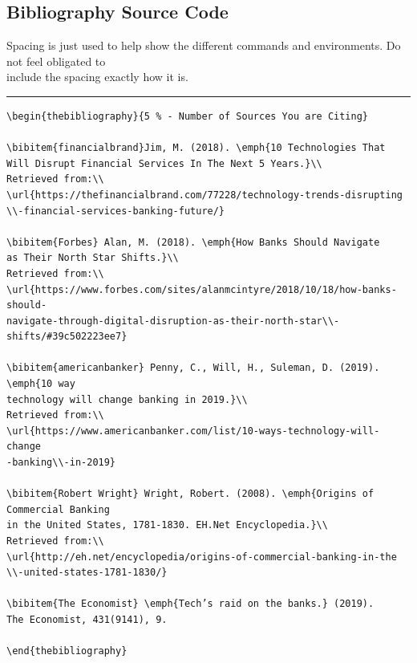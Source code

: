 \documentclass[12pt,hidelinks]{article}
\begin{document}
\subsection{Bibliography Source Code}
Spacing is just used to help show the different commands and environments. Do not feel obligated to\\
include the spacing exactly how it is.\\
\hrule
	\vspace{4mm}
\begin{verbatim}
\begin{thebibliography}{5 % - Number of Sources You are Citing}

\bibitem{financialbrand}Jim, M. (2018). \emph{10 Technologies That 
Will Disrupt Financial Services In The Next 5 Years.}\\
Retrieved from:\\
\url{https://thefinancialbrand.com/77228/technology-trends-disrupting
\\-financial-services-banking-future/}

\bibitem{Forbes} Alan, M. (2018). \emph{How Banks Should Navigate
as Their North Star Shifts.}\\
Retrieved from:\\ 
\url{https://www.forbes.com/sites/alanmcintyre/2018/10/18/how-banks-should-
navigate-through-digital-disruption-as-their-north-star\\-shifts/#39c502223ee7}

\bibitem{americanbanker} Penny, C., Will, H., Suleman, D. (2019). \emph{10 way 
technology will change banking in 2019.}\\
Retrieved from:\\ 
\url{https://www.americanbanker.com/list/10-ways-technology-will-change
-banking\\-in-2019}

\bibitem{Robert Wright} Wright, Robert. (2008). \emph{Origins of Commercial Banking
in the United States, 1781-1830. EH.Net Encyclopedia.}\\
Retrieved from:\\							
\url{http://eh.net/encyclopedia/origins-of-commercial-banking-in-the
\\-united-states-1781-1830/}

\bibitem{The Economist} \emph{Tech’s raid on the banks.} (2019). 
The Economist, 431(9141), 9.

\end{thebibliography}
\end{verbatim}
\newpage
{}
\end{document}
